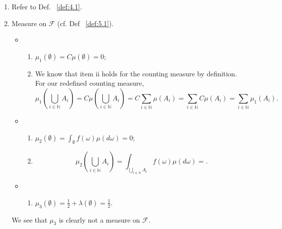 \begin{exercise}[]
    \label{ex:mock1}
    \begin{enumerate}[label=(\alph*)] \hfill
        \item Refer to Def. ~\ref{def:4.1}.
        \item Measure on $\mathcal{F}$ (cf. Def ~\ref{def:5.1}).
            \begin{itemize}

                \item 
                    \begin{enumerate}[label=(\roman*)]
                        \item $\mu_1(\emptyset) = C\mu(\emptyset)= 0$;
                        \item We know that item ii holds for the counting measure by definition. For our redefined
                            counting measure,
                            \[
                            \mu_1(\bigcup_{i \in \mathbb{N}} A_i) = C\mu(\bigcup_{i \in \mathbb{N}} A_i)
                            = C \sum_{i \in \mathbb{N}}^{ } \mu(A_i) = \sum_{i \in \mathbb{N}}^{ } C\mu(A_i)
                            = \sum_{i \in \mathbb{N}}^{ } \mu_1(A_i)
                            .\] 
                    \end{enumerate}

                \item
                    \begin{enumerate}[label=(\roman*)]
                        \item $\mu_2(\emptyset) = \int_{\emptyset} f(\omega)\mu(d\omega) = 0$;
                        \item 
                            \[
                            \mu_2(\bigcup_{i \in \mathbb{N}} A_i) = \int_{\bigcup_{i \in \mathbb{N}} A_i} f(\omega)\mu(d\omega)
                            = 
                            .\] 
                    \end{enumerate}

                \item
                    \begin{enumerate}[label=(\roman*)]
                        \item $\mu_3(\emptyset) = \frac{1}{2} + \lambda(\emptyset) = \frac{1}{2}$. 
                    \end{enumerate}

            \end{itemize}
            We see that  $\mu_3$ is clearly not a measure on $\mathcal{F}$.
    \end{enumerate}
\end{exercise}
